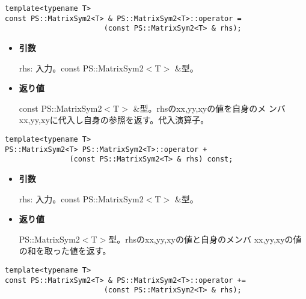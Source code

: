 
\begin{screen}
\begin{verbatim}
template<typename T>
const PS::MatrixSym2<T> & PS::MatrixSym2<T>::operator = 
                       (const PS::MatrixSym2<T> & rhs);
\end{verbatim}
\end{screen}

\begin{itemize}

\item{{\bf 引数}}

{rhs}: 入力。{const PS::MatrixSym2$<$T$>$ \&}型。

\item{{\bf 返り値}}

{const PS::MatrixSym2$<$T$>$ \&}型。{rhs}のxx,yy,xyの値を自身のメ
ンバxx,yy,xyに代入し自身の参照を返す。代入演算子。

\end{itemize}


\begin{screen}
\begin{verbatim}
template<typename T>
PS::MatrixSym2<T> PS::MatrixSym2<T>::operator + 
               (const PS::MatrixSym2<T> & rhs) const;
\end{verbatim}
\end{screen}

\begin{itemize}

\item{{\bf 引数}}

{rhs}: 入力。{const PS::MatrixSym2$<$T$>$ \&}型。

\item{{\bf 返り値}}

{PS::MatrixSym2$<$T$>$}型。{rhs}のxx,yy,xyの値と自身のメンバ
xx,yy,xyの値の和を取った値を返す。

\end{itemize}

\begin{screen}
\begin{verbatim}
template<typename T>
const PS::MatrixSym2<T> & PS::MatrixSym2<T>::operator += 
                       (const PS::MatrixSym2<T> & rhs);
\end{verbatim}
\end{screen}

